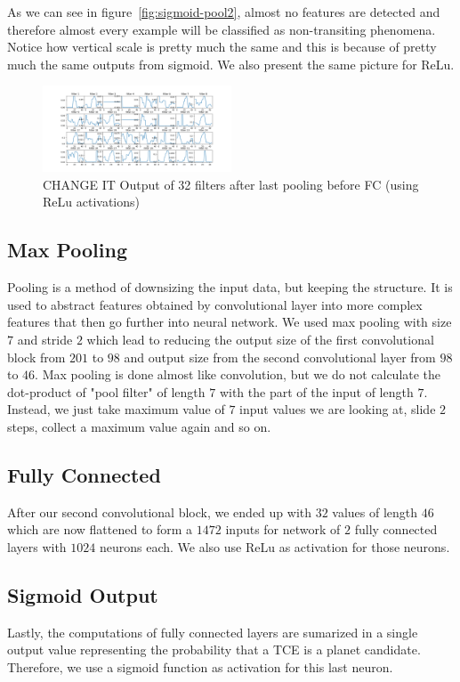 \documentclass[twoside]{article}
\begin{document}
\begin{multicols}{2}
As we can see in figure~\ref{fig:sigmoid-pool2}, almost no features are detected and therefore almost every example will be classified as non-transiting phenomena. Notice how vertical scale is pretty much the same and this is because of pretty much the same outputs from sigmoid. We also present the same picture for ReLu.
\begin{figure}[H]
\includegraphics[width=0.5\textwidth]{relu_pooling2}
\caption{CHANGE IT Output of 32 filters after last pooling before FC (using ReLu activations)}
\label{fig:relu-pool2}
\end{figure}

\subsection{Max Pooling}
Pooling is a method of downsizing the input data, but keeping the structure. It is used to abstract features obtained by convolutional layer into more complex features that then go further into neural network. We used max pooling with size $7$ and stride $2$ which lead to reducing the output size of the first convolutional block from $201$ to $98$ and output size from the second convolutional layer from $98$ to $46$. Max pooling is done almost like convolution, but we do not calculate the dot-product of "pool filter" of length $7$ with the part of the input of length $7$. Instead, we just take maximum value of $7$ input values we are looking at, slide $2$ steps, collect a maximum value again and so on.

\subsection{Fully Connected}
After our second convolutional block, we ended up with $32$ values of length $46$ which are now flattened to form a $1472$ inputs for network of $2$ fully connected layers with $1024$ neurons each. We also use ReLu as activation for those neurons.

\subsection{Sigmoid Output}
Lastly, the computations of fully connected layers are sumarized in a single output value representing the probability that a TCE is a planet candidate. Therefore, we use a sigmoid function as activation for this last neuron.



\end{multicols}
\end{document}
